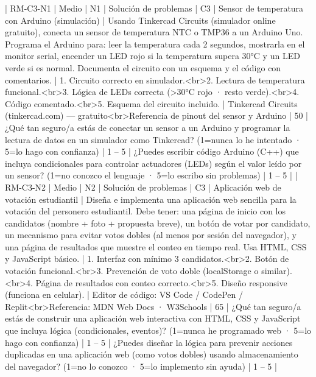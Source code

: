 | RM-C3-N1 | Medio | N1 | Solución de problemas | C3 | Sensor de temperatura con Arduino (simulación) | Usando Tinkercad Circuits (simulador online gratuito), conecta un sensor de temperatura NTC o TMP36 a un Arduino Uno. Programa el Arduino para: leer la temperatura cada 2 segundos, mostrarla en el monitor serial, encender un LED rojo si la temperatura supera 30°C y un LED verde si es normal. Documenta el circuito con un esquema y el código con comentarios. | 1. Circuito correcto en simulador.<br>2. Lectura de temperatura funcional.<br>3. Lógica de LEDs correcta (>30°C rojo · resto verde).<br>4. Código comentado.<br>5. Esquema del circuito incluido. | Tinkercad Circuits (tinkercad.com) — gratuito<br>Referencia de pinout del sensor y Arduino | 50 | ¿Qué tan seguro/a estás de conectar un sensor a un Arduino y programar la lectura de datos en un simulador como Tinkercad? (1=nunca lo he intentado · 5=lo hago con confianza) | 1 – 5 | ¿Puedes escribir código Arduino (C++) que incluya condicionales para controlar actuadores (LEDs) según el valor leído por un sensor? (1=no conozco el lenguaje · 5=lo escribo sin problemas) | 1 – 5 |
| RM-C3-N2 | Medio | N2 | Solución de problemas | C3 | Aplicación web de votación estudiantil | Diseña e implementa una aplicación web sencilla para la votación del personero estudiantil. Debe tener: una página de inicio con los candidatos (nombre + foto + propuesta breve), un botón de votar por candidato, un mecanismo para evitar votos dobles (al menos por sesión del navegador), y una página de resultados que muestre el conteo en tiempo real. Usa HTML, CSS y JavaScript básico. | 1. Interfaz con mínimo 3 candidatos.<br>2. Botón de votación funcional.<br>3. Prevención de voto doble (localStorage o similar).<br>4. Página de resultados con conteo correcto.<br>5. Diseño responsive (funciona en celular). | Editor de código: VS Code / CodePen / Replit<br>Referencia: MDN Web Docs · W3Schools | 65 | ¿Qué tan seguro/a estás de construir una aplicación web interactiva con HTML, CSS y JavaScript que incluya lógica (condicionales, eventos)? (1=nunca he programado web · 5=lo hago con confianza) | 1 – 5 | ¿Puedes diseñar la lógica para prevenir acciones duplicadas en una aplicación web (como votos dobles) usando almacenamiento del navegador? (1=no lo conozco · 5=lo implemento sin ayuda) | 1 – 5 |
